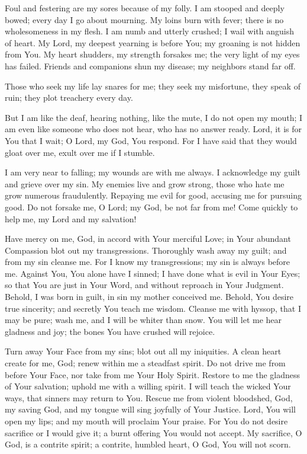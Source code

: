 Foul and festering are my sores because of my folly.
I am stooped and deeply bowed;
every day I go about mourning.
My loins burn with fever;
there is no wholesomeness in my flesh.
I am numb and utterly crushed;
I wail with anguish of heart.
My Lord, my deepest yearning is before You;
my groaning is not hidden from You.
My heart shudders, my strength forsakes me;
the very light of my eyes has failed.
Friends and companions shun my disease;
my neighbors stand far off.

Those who seek my life lay snares for me;
they seek my misfortune, they speak of ruin;
they plot treachery every day.

But I am like the deaf, hearing nothing, like the mute, I do not open my mouth;
I am even like someone who does not hear, who has no answer ready.
Lord, it is for You that I wait;
O Lord, my God, You respond.
For I have said that they would gloat over me, exult over me if I stumble.

I am very near to falling;
my wounds are with me always.
I acknowledge my guilt
and grieve over my sin.
My enemies live and grow strong, those who hate me grow numerous fraudulently.
Repaying me evil for good,
accusing me for pursuing good.
Do not forsake me, O Lord;
my God, be not far from me!
Come quickly to help me, my Lord and my salvation!

Have mercy on me, God, in accord with Your merciful Love;
in Your abundant Compassion blot out my transgressions.
Thoroughly wash away my guilt;
and from my sin cleanse me.
For I know my transgressions;
my sin is always before me.
Against You, You alone have I sinned;
I have done what is evil in Your Eyes;
so that You are just in Your Word, and without reproach in Your Judgment.
Behold, I was born in guilt, in sin my mother conceived me.
Behold, You desire true sincerity;
and secretly You teach me wisdom.
Cleanse me with hyssop, that I may be pure;
wash me, and I will be whiter than snow.
You will let me hear gladness and joy;
the bones You have crushed will rejoice.

Turn away Your Face from my sins;
blot out all my iniquities.
A clean heart create for me, God;
renew within me a steadfast spirit.
Do not drive me from before Your Face, nor take from me Your Holy Spirit.
Restore to me the gladness of Your salvation;
uphold me with a willing spirit.
I will teach the wicked Your ways, that sinners may return to You.
Rescue me from violent bloodshed, God, my saving God, and my tongue will sing joyfully of Your Justice.
Lord, You will open my lips;
and my mouth will proclaim Your praise.
For You do not desire sacrifice or I would give it;
a burnt offering You would not accept.
My sacrifice, O God, is a contrite spirit;
a contrite, humbled heart, O God, You will not scorn.

